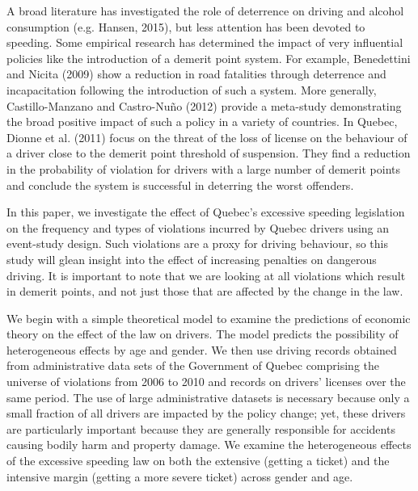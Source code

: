 A broad literature has investigated the role of deterrence on driving and alcohol consumption (e.g. Hansen, 2015), but less attention has been devoted to speeding. Some empirical research has determined the impact of very influential policies like the introduction of a demerit point system. For example, Benedettini and Nicita (2009) show a reduction in road fatalities through deterrence and incapacitation following the introduction of such a system. More generally, Castillo-Manzano and Castro-Nuño (2012) provide a meta-study demonstrating the broad positive impact of such a policy in a variety of countries. In Quebec, Dionne et al. (2011) focus on the threat of the loss of license on the behaviour of a driver close to the demerit point threshold of suspension. They find a reduction in the probability of violation for drivers with a large number of demerit points and conclude the system is successful in deterring the worst offenders.

In this paper, we investigate the effect of Quebec’s excessive speeding legislation on the frequency and types of violations incurred by Quebec drivers using an event-study design. Such violations are a proxy for driving behaviour, so this study will glean insight into the effect of increasing penalties on dangerous driving. It is important to note that we are looking at all violations which result in demerit points, and not just those that are affected by the change in the law. 

We begin with a simple theoretical model to examine the predictions of economic theory on the effect of the law on drivers. The model predicts the possibility of heterogeneous effects by age and gender. We then use driving records obtained from administrative data sets of the Government of Quebec comprising the universe of violations from 2006 to 2010 and records on drivers’ licenses over the same period. The use of large administrative datasets is necessary because only a small fraction of all drivers are impacted by the policy change; yet, these drivers are particularly important because they are generally responsible for accidents causing bodily harm and property damage. We examine the heterogeneous effects of the excessive speeding law on both the extensive (getting a ticket) and the intensive margin (getting a more severe ticket) across gender and age. 

